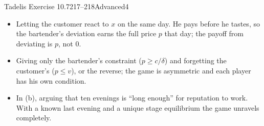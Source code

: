 \begin{exsol}{Tadelis Exercise 10.7}{217--218}{Advanced}{4}
\mistakes
\begin{itemize}
  \item Letting the customer react to $x$ on the same day. He pays before he tastes, so the
  bartender's deviation earns the full price $p$ that day; the payoff from deviating is $p$, not $0$.
  \item Giving only the bartender's constraint ($p \ge c/\delta$) and forgetting the customer's
  ($p \le v$), or the reverse; the game is asymmetric and each player has his own condition.
  \item In (b), arguing that ten evenings is ``long enough'' for reputation to work. With a known last
  evening and a unique stage equilibrium the game unravels completely.
\end{itemize}

\end{exsol}

